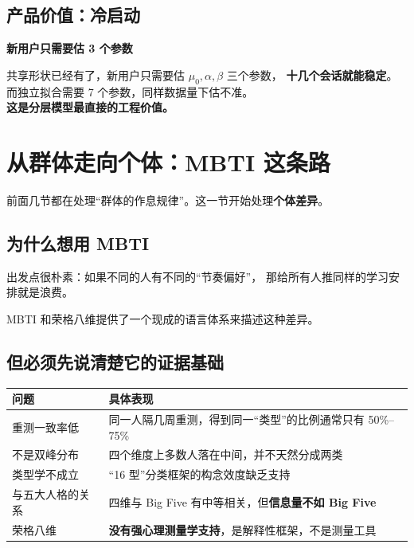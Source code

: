 \documentclass[UTF8,a4paper,11pt]{ctexart}
\newenvironment{explainbox}[1]
{\begin{center}\begin{minipage}{0.94\textwidth}\colorbox{boxbg}{\parbox{0.92\textwidth}{\textbf{#1}\par\vspace{2pt}}}}
{\end{minipage}\end{center}}
\begin{document}
\subsection{产品价值：冷启动}

\begin{explainbox}{新用户只需要估 3 个参数}
共享形状已经有了，新用户只需要估 $\mu_0,\alpha,\beta$ 三个参数，
\textbf{十几个会话就能稳定}。\\
而独立拟合需要 7 个参数，同样数据量下估不准。\\[4pt]
\textbf{这是分层模型最直接的工程价值。}
\end{explainbox}

\newpage

\section{从群体走向个体：MBTI 这条路}

前面几节都在处理“群体的作息规律”。这一节开始处理\textbf{个体差异}。

\subsection{为什么想用 MBTI}

出发点很朴素：如果不同的人有不同的“节奏偏好”，
那给所有人推同样的学习安排就是浪费。

MBTI 和荣格八维提供了一个现成的语言体系来描述这种差异。

\subsection{但必须先说清楚它的证据基础}

\begin{longtable}{@{}p{3.6cm}p{10.2cm}@{}}
\toprule
\textbf{问题} & \textbf{具体表现} \\
\midrule
重测一致率低 & 同一人隔几周重测，得到同一“类型”的比例通常只有 50\%--75\% \\
不是双峰分布 & 四个维度上多数人落在中间，并不天然分成两类 \\
类型学不成立 & “16 型”分类框架的构念效度缺乏支持 \\
与五大人格的关系 & 四维与 Big Five 有中等相关，但\textbf{信息量不如 Big Five} \\
荣格八维 & \textbf{没有强心理测量学支持}，是解释性框架，不是测量工具 \\
\bottomrule
\end{longtable}
\end{document}
